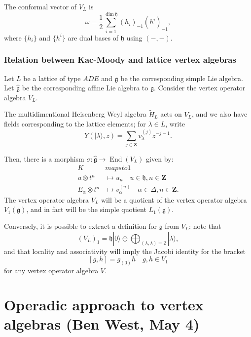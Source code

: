 \documentclass{article}
\newcommand{\ZZ}{\mathbold{Z}}
\newcommand{\vac}{|0\rangle}
\newcommand{\gf}{\mathfrak{g}}
\newcommand{\hh}{\mathfrak{h}}
\newcommand{\ghat}{\widehat{\mathfrak{g}}}
\DeclareMathOperator{\End}{End}
\begin{document}
The conformal vector of $V_L$ is
\[\omega=\frac{1}{2} \sum_{i=1}^{\dim \hh}(h_i)_{-1}(h^i)_{-1}, \]
where $\{h_i\}$ and $\{h^i\}$ are dual bases of $\hh$ using $(-,-)$.
\subsubsection{Relation between Kac-Moody and lattice vertex algebras}
Let $L$ be a lattice of type $ADE$ and $\gf$ be the corresponding simple Lie algebra.  Let $\ghat$ be the corresponding affine Lie algebra to $\gf$.  Consider the vertex operator algebra $V_L$.

The multidimentional Heisenberg Weyl algebra $\widetilde{H}_L$ acts on $V_L$, and we also have fields corresponding to the lattice elements; for $\lambda \in L$, write
\[Y(|\lambda\rangle,z)=\sum_{j \in \ZZ}v^{(j)}_\lambda z^{-j-1}. \]

Then, there is a morphism $\sigma: \ghat \rightarrow \End(V_L)$ given by:
\begin{align}
  K &mapsto 1\\
  u \otimes t^n &\mapsto u_n \quad u \in \hh, n \in \ZZ\\
  E_\alpha \otimes t^n &\mapsto v^{(n)}_\alpha \quad \alpha \in \Delta, n \in \ZZ.
\end{align}
The vertex operator algebra $V_L$ will be a quotient of the vertex operator algebra $V_1(\gf)$, and in fact will be the simple quotient $L_1(\gf)$.

Conversely, it is possible to extract a definition for $\gf$ from $V_L$: note that
\[(V_L)_1 = \hh \vac \oplus \bigoplus_{(\lambda,\lambda)=2}|\lambda\rangle, \]
and that locality and associativity will imply the Jacobi identity for the bracket
\[[g,h]=g_{(0)}h \quad g,h \in V_1 \]
for any vertex operator algebra $V$.
\section{Operadic approach to vertex algebras (Ben West, May 4)}
\end{document}
